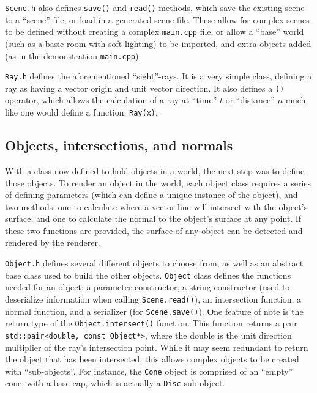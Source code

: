 \documentclass[a4paper]{article}
\begin{document}
\verb|Scene.h| also defines \verb|save()| and \verb|read()| methods, which save the existing scene to a ``scene'' file, or load in a generated scene file. These allow for complex scenes to be defined without creating a complex \verb|main.cpp| file, or allow a ``base'' world (such as a basic room with soft lighting) to be imported, and extra objects added (as in the demonstration \verb|main.cpp|).

\verb|Ray.h| defines the aforementioned ``sight''-rays. It is a very simple class, defining a ray as having a vector origin and unit vector direction. It also defines a \verb|()| operator, which allows the calculation of a ray at ``time'' $t$ or ``distance'' $\mu$ much like one would define a function: \verb|Ray(x)|.

\subsection{Objects, intersections, and normals}
With a class now defined to hold objects in a world, the next step was to define those objects. To render an object in the world, each object class requires a series of defining parameters (which can define a unique instance of the object), and two methods: one to calculate where a vector line will intersect with the object's surface, and one to calculate the normal to the object's surface at any point. If these two functions are provided, the surface of any object can be detected and rendered by the renderer.

\verb|Object.h| defines several different objects to choose from, as well as an abstract base class used to build the other objects. \verb|Object| class defines the functions needed for an object: a parameter constructor, a string constructor (used to deserialize information when calling \verb|Scene.read()|), an intersection function, a normal function, and a serializer (for \verb|Scene.save()|). One feature of note is the return type of the \verb|Object.intersect()| function. This function returns a pair \verb|std::pair<double, const Object*>|, where the double is the unit direction multiplier of the ray's intersection point. While it may seem redundant to return the object that has been intersected, this allows complex objects to be created with ``sub-objects''. For instance, the \verb|Cone| object is comprised of an ``empty'' cone, with a base cap, which is actually a \verb|Disc| sub-object.
\end{document}
